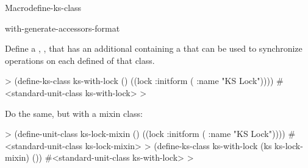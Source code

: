 \documentclass[10pt,twoside,english,pdftex]{article}
\begin{document}
\begin{functiondoc}{Macro}{define-ks-class}
\classoptioninheritance

\begin{alsos}{with-generate-accessors-format}
\also[define-ks]
\end{alsos}

\fnexamples Define a , , that has an
additional  containing a  that can be used to
synchronize operations on each defined  of that class.
%
\W\supp
\begin{example}
  > (define-ks-class ks-with-lock ()
      ((lock :initform ( :name "KS Lock"))))
  #<standard-unit-class ks-with-lock>
  >
\end{example}
%
Do the same, but with a mixin class:
%
\W\supp\notpretop
\begin{example}
  > (define-unit-class ks-lock-mixin ()
      ((lock :initform ( :name "KS Lock"))))
  #<standard-unit-class ks-lock-mixin>
  > (define-ks-class ks-with-lock (ks ks-lock-mixin)
      ())
  #<standard-unit-class ks-with-lock>
  >
\end{example}

\end{functiondoc}

\end{document}
